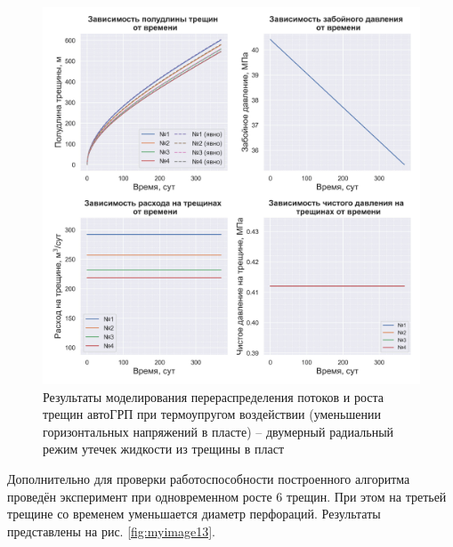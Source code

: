 \begin{figure}[H] 
\center
\includegraphics[width=\linewidth]{images/myimage12.jpg}
\caption{Результаты моделирования перераспределения потоков и роста трещин автоГРП при термоупругом воздействии (уменьшении горизонтальных напряжений в пласте) -- двумерный радиальный режим утечек жидкости из трещины в пласт}
\label{fig:myimage12}
\end{figure}

Дополнительно для проверки работоспособности построенного алгоритма проведён эксперимент при одновременном росте 6 трещин.
При этом на третьей трещине со временем уменьшается диаметр перфораций.
Результаты представлены на рис. \ref{fig:myimage13}.


